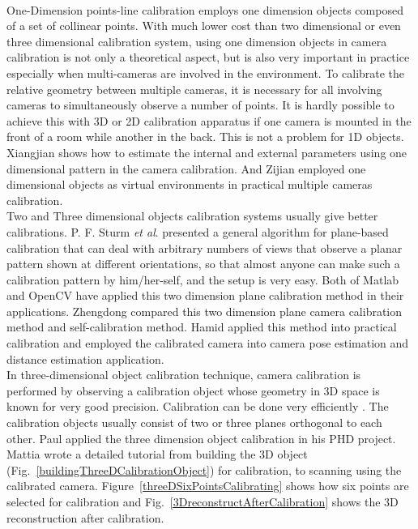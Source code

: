 \\\indent
One-Dimension points-line calibration employs one dimension objects composed of a set of collinear points. With much lower cost than two dimensional or even three dimensional calibration system, using one dimension objects in camera calibration is not only a theoretical aspect, but is also very important in practice especially when multi-cameras are involved in the environment. To calibrate the relative geometry between multiple cameras, it is necessary for all involving cameras to simultaneously observe a number of points. It is hardly possible to achieve this with 3D or 2D calibration apparatus if one camera is mounted in the front of a room while another in the back. This is not a problem for 1D objects. Xiangjian \cite{oneDcalibration1_2006} shows how to estimate the internal and external parameters using one dimensional pattern in the camera calibration. And Zijian \cite{oneDcalibration2_2008} employed one dimensional objects as virtual environments in practical multiple cameras calibration.
\\\indent
Two and Three dimensional objects calibration systems usually give better calibrations. P. F. Sturm \textit{et al}. \cite{twoDcalibration1_1999} presented a general algorithm for plane-based calibration
that can deal with arbitrary numbers of views that observe a planar pattern shown at different orientations, so that almost anyone can make such a calibration pattern by him/her-self, and the setup is very easy. Both of Matlab and OpenCV have applied this two dimension plane calibration method in their applications. Zhengdong \cite{twoDcalibration2_2011} compared this two dimension plane camera calibration method and self-calibration method. Hamid \cite{twoDcalibration3_2015} applied this method into practical calibration and employed the calibrated camera into camera pose estimation and distance estimation application.
\\\indent
In three-dimensional object calibration technique, camera calibration is performed by observing a calibration object whose geometry in 3D space is known for very good precision. Calibration can be done very efficiently \cite{treeDcalibration1_1993}. The calibration objects usually consist of two or three planes orthogonal to each other. Paul \cite{treeDcalibration2_1996} applied the three dimension object calibration in his PHD project. Mattia \cite{threeDExample_2014} wrote a detailed tutorial from building the 3D object (Fig.~\ref{buildingThreeDCalibrationObject}) for calibration, to scanning using the calibrated camera. Figure~\ref{threeDSixPointsCalibrating} shows how six points are selected for calibration and Fig.~\ref{3DreconstructAfterCalibration} shows the 3D reconstruction after calibration.
